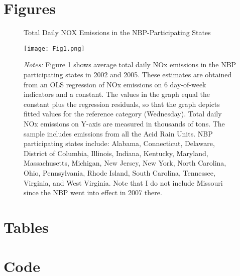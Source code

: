 \documentclass[12pt]{article}
\begin{document}
\clearpage
\section*{Figures}

\begin{figure}[h!]
\centering
\caption{Total Daily NOX Emissions in the NBP-Participating States}
\texttt{[image: Fig1.png]}
\caption*{\footnotesize{\emph{Notes:} Figure 1 shows average total daily NOx emissions in the NBP participating states in 2002 and 2005. These estimates are obtained from an OLS regression of NOx emissions on 6 day-of-week indicators and a constant. The values in the graph equal the constant plus the regression residuals, so that the graph depicts fitted values for the reference category (Wednesday). Total daily NOx emissions on Y-axis are measured in thousands of tons. The sample includes emissions from all the Acid Rain Units. NBP participating states include: Alabama, Connecticut, Delaware, District of Columbia, Illinois, Indiana, Kentucky, Maryland, Massachusetts, Michigan, New Jersey, New York, North Carolina, Ohio, Pennsylvania, Rhode Island, South Carolina, Tennessee, Virginia, and West Virginia. Note that I do not include Missouri since the NBP went into effect in 2007 there.}}
\label{fig1}
\end{figure}

\clearpage

\section*{Tables}



\vspace{2cm}



\clearpage

\section*{Code}
\end{document}
